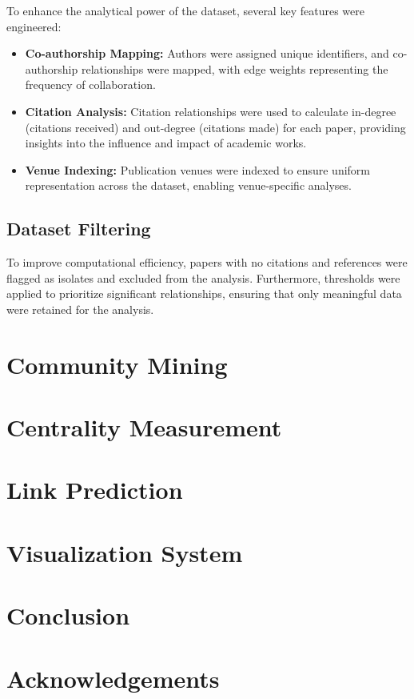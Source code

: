 \documentclass[11pt]{article}
\begin{document}
To enhance the analytical power of the dataset, several key features were engineered:

\begin{itemize}
	\item \textbf{Co-authorship Mapping:} Authors were assigned unique identifiers, and co-authorship relationships were mapped, with edge weights representing the frequency of collaboration.
	\item \textbf{Citation Analysis:} Citation relationships were used to calculate in-degree (citations received) and out-degree (citations made) for each paper, providing insights into the influence and impact of academic works.
	\item \textbf{Venue Indexing:} Publication venues were indexed to ensure uniform representation across the dataset, enabling venue-specific analyses.
\end{itemize}

\subsection{Dataset Filtering}

To improve computational efficiency, papers with no citations and references were flagged as isolates and excluded from the analysis. Furthermore, thresholds were applied to prioritize significant relationships, ensuring that only meaningful data were retained for the analysis.



\section{Community Mining}

\section{Centrality Measurement}

\section{Link Prediction}

\section{Visualization System}

\section{Conclusion}

\section*{Acknowledgements}


% 
% 



\end{document}
